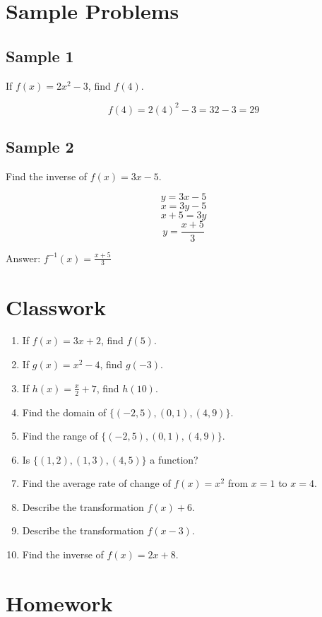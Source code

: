 \documentclass[11pt]{book}
\begin{document}
\section{Sample Problems}

\subsection{Sample 1}

If \(f(x)=2x^2-3\), find \(f(4)\).

\[f(4)=2(4)^2-3=32-3=29\]

\subsection{Sample 2}

Find the inverse of \(f(x)=3x-5\).

\[y=3x-5\]
\[x=3y-5\]
\[x+5=3y\]
\[y=\frac{x+5}{3}\]

Answer: \(f^{-1}(x)=\frac{x+5}{3}\)

\section{Classwork}

\begin{enumerate}
\item If \(f(x)=3x+2\), find \(f(5)\).
\item If \(g(x)=x^2-4\), find \(g(-3)\).
\item If \(h(x)=\frac{x}{2}+7\), find \(h(10)\).
\item Find the domain of \(\{(-2,5),(0,1),(4,9)\}\).
\item Find the range of \(\{(-2,5),(0,1),(4,9)\}\).
\item Is \(\{(1,2),(1,3),(4,5)\}\) a function?
\item Find the average rate of change of \(f(x)=x^2\) from \(x=1\) to \(x=4\).
\item Describe the transformation \(f(x)+6\).
\item Describe the transformation \(f(x-3)\).
\item Find the inverse of \(f(x)=2x+8\).
\end{enumerate}

\section{Homework}
\end{document}
